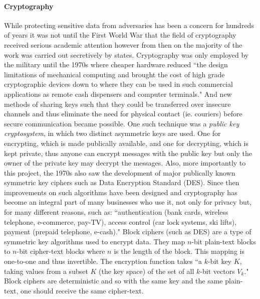 \documentclass[12pt, titlepage]{article}
\begin{document}
\paragraph*{Cryptography}
While protecting sensitive data from adversaries has been a concern for hundreds of years it was not until the First World War that the field of cryptography received serious academic attention however from then on the majority of the work was carried out secretively by states.\cite{appliedCryptoBook} Cryptography was only employed by the military until the 1970s where cheaper hardware reduced ``the design limitations of mechanical computing and brought the cost of high grade cryptographic devices down to where they can be used in such commercial applications as remote cash dispensers and computer terminals."\cite{newCryptoDirections} And new methods of sharing keys such that they could be transferred over insecure channels and thus eliminate the need for physical contact (ie. couriers) before secure communication became possible. One such technique was a \textit{public key cryptosystem}, in which two distinct asymmetric keys are used. One for encrypting, which is made publically available, and one for decrypting, which is kept private, thus anyone can encrypt messages with the public key but only the owner of the private key may decrypt the messages. Also, more importantly to this project, the 1970s also saw the development of major publically known symmetric key ciphers such as Data Encryption Standard (DES). Since then improvements on such algorithms have been designed and cryptography has become an integral part of many businesses who use it, not only for privacy but, for many different reasons, such as: ``authentication (bank cards, wireless telephone, e-commerce, pay-TV), access control (car lock systems, ski lifts), payment (prepaid telephone, e-cash)."\cite{classicalCryptoBook}
\newline \indent Block ciphers (such as DES) are a type of symmetric key algorithms used to encrypt data. They map $n$-bit plain-text blocks to $n$-bit cipher-text blocks where $n$ is the length of the block. This mapping is one-to-one and thus invertible. The encryption function takes ``a $k$-bit key $K$, taking values from a subset $K$ (the key space) of the set of all $k$-bit vectors $V_{k}$." \cite{blockCiphers} Block ciphers are deterministic and so with the same key and the same plain-text, one should receive the same cipher-text.
\end{document}
